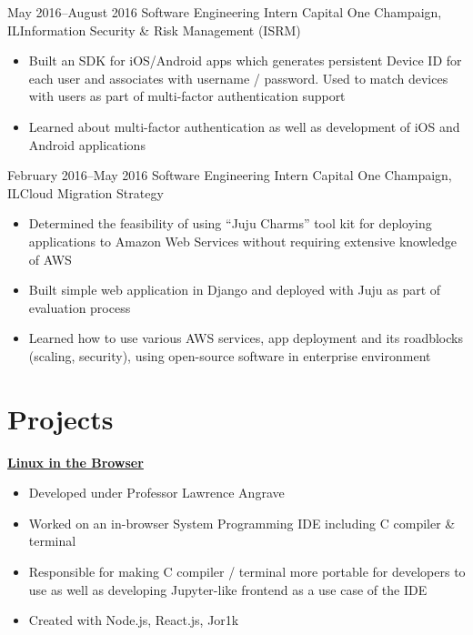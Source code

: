 \documentclass[10pt,a4paper,sans]{moderncv}        %
\begin{document}
\vspace{3pt}

\cventry
{May 2016--August 2016}
{\vspace{3pt}Software Engineering Intern}
{Capital One}
{Champaign, IL}{Information Security \& Risk Management (ISRM)}
{\vspace{3pt}
\begin{itemize}
  \item Built an SDK for iOS/Android apps which generates persistent
        Device ID for each user and associates with username / password.
        Used to match devices with users as part of multi-factor authentication support
  \item Learned about multi-factor authentication as well as development of iOS and Android
        applications
\end{itemize}}

\vspace{3pt}

\cventry
{February 2016--May 2016}
{\vspace{3pt}Software Engineering Intern}
{Capital One}
{Champaign, IL}{Cloud Migration Strategy}
{\vspace{3pt}
\begin{itemize}
  \item Determined the feasibility of using ``Juju Charms'' tool kit
        for deploying applications to Amazon Web Services without requiring extensive
        knowledge of AWS
  \item Built simple web application in Django and deployed with Juju
        as part of evaluation process
  \item Learned how to use various AWS services, app deployment and its roadblocks (scaling, security),
        using open-source software in enterprise environment
\end{itemize}}

\section{Projects}

\vspace{5pt}
\textbf{\href{http://cs-education.github.io/sys/}{Linux in the Browser}}
\begin{itemize}
  \item Developed under Professor Lawrence Angrave
  \item Worked on an in-browser System Programming IDE including C compiler \& terminal
  \item Responsible for making C compiler / terminal more portable for developers to use
        as well as developing Jupyter-like frontend as a use case of the IDE
  \item Created with Node.js, React.js, Jor1k
\end{itemize}
\end{document}
